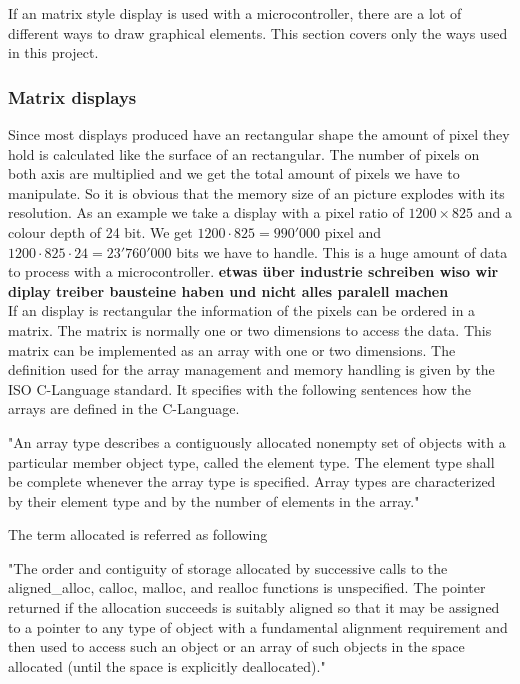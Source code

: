 
If an matrix style display is used with a microcontroller, there are a lot of different ways to draw graphical elements. This section covers only the ways used in this project. 

\subsubsection{Matrix displays}

Since most displays produced have an rectangular shape the amount of pixel they hold is calculated like the surface of an rectangular. The number of pixels on both axis are multiplied and we get the total amount of pixels we have to manipulate. So it is obvious that the memory size of an picture explodes with its resolution. As an example we take a display with a pixel ratio of $1200 \times 825$ and a colour depth of 24 bit. We get $1200\cdot825=990'000$ pixel and $1200\cdot825\cdot24=23'760'000$ bits we have to handle. This is a huge amount of data to process with a microcontroller. \textbf{etwas über industrie schreiben wiso wir diplay treiber bausteine haben und nicht alles paralell machen}\\

If an display is rectangular the information of the pixels can be ordered in a matrix. The matrix is normally one or two dimensions to access the data. This matrix can be implemented as an array with one or two dimensions. The definition used for the array management and memory handling is given by the ISO C-Language standard. It specifies with the following sentences how the arrays are defined in the C-Language. 


\begin{displayquote}
	"An array type describes a contiguously allocated nonempty set of objects with a particular member object type, called the element type. The element type shall be complete whenever the array type is specified. Array types are characterized by their element type and by the number of elements in the array."
\end{displayquote}\cite{ISO/IEC9899}

The term allocated is referred as following 

\begin{displayquote}
	"The order and contiguity of storage allocated by successive calls to the aligned\_alloc, calloc, malloc, and realloc functions is unspecified. The pointer returned if the allocation succeeds is suitably aligned so that it may be assigned to a pointer to any type of object with a fundamental alignment requirement and then used to access such an object or an array of such objects in the space allocated (until the space is explicitly deallocated)."
\end{displayquote}\cite{ISO/IEC9899}

